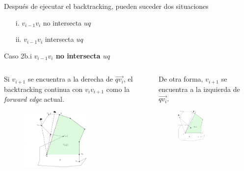 \documentclass[aspectratio=169,xcolor=dvipsnames, t]{beamer}
\begin{document}
\begin{frame}[c]
    Después de ejecutar el backtracking, pueden suceder dos situaciones
    \begin{center}
        \begin{enumerate}
            \item [i.] $v_{i-1}v_{i}$ no intersecta $uq$
            \item [ii.] $v_{i-1}v_{i}$ intersecta $uq$
        \end{enumerate}
    \end{center}
\end{frame}

\begin{frame}{Caso 2b.i}
    \textbf{$v_{i-1}v_{i}$ no intersecta $uq$}\\ 
    \begin{columns}
    \begin{column}{0.45\textwidth}
    Si $v_{i+1}$ se encuentra a la derecha de $\overrightarrow{qv_{i}}$, el backtracking continua con $v_{i}v_{i+1}$ como la \textit{forward edge} actual.
        \begin{figure}
            \centering
            \includegraphics[width=0.6\textwidth]{imagenes/Caso2.5b.png}
        \end{figure}
    \end{column}
    \begin{column}{0.45\textwidth}  %
        De otra forma, $v_{i+1}$ se encuentra a la izquierda de $\overrightarrow{qv_{i}}.$
        \begin{figure}
            \centering
            \includegraphics[width=0.5\textwidth]{imagenes/Caso2.6a.png}

\end{figure}
\end{column}
\end{columns}
\end{frame}
\end{document}
